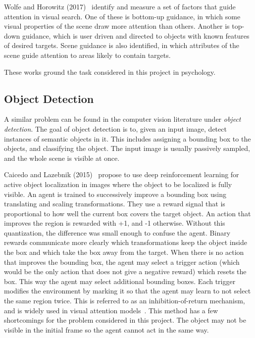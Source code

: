 Wolfe and Horowitz (2017)~\cite{wolfe_horowitz_2017} identify and measure a set of factors that guide attention in visual search.
One of these is bottom-up guidance, in which some visual properties of the scene draw more attention than others.
Another is top-down guidance, which is user driven and directed to objects with known features of desired targets.
Scene guidance is also identified, in which attributes of the scene guide attention to areas likely to contain targets. 

These works ground the task considered in this project in psychology.


\subsection{Object Detection}


A similar problem can be found in the computer vision literature under \textit{object detection}.
The goal of object detection is to, given an input image, detect instances of semantic objects in it.
This includes assigning a bounding box to the objects, and classifying the object.
The input image is usually passively sampled, and the whole scene is visible at once.

Caicedo and Lazebnik (2015)~\cite{caicedo_active_2015} propose to use deep reinforcement learning for active object localization in images where the object to be localized is fully visible.
An agent is trained to successively improve a bounding box using translating and scaling transformations.
They use a reward signal that is proportional to how well the current box covers the target object.
An action that improves the region is rewarded with +1, and -1 otherwise.
Without this quantization, the difference was small enough to confuse the agent.
Binary rewards communicate more clearly which transformations keep the object inside the box and which take the box away from the target.
When there is no action that improves the bounding box, the agent may select a trigger action (which would be the only action that does not give a negative reward) which resets the box.
This way the agent may select additional bounding boxes.
Each trigger modifies the environment by marking it so that the agent may learn to not select the same region twice.
This is referred to as an inhibition-of-return mechanism, and is widely used in visual attention models~\cite{[16] in caicedo_active_2015}.
This method has a few shortcomings for the problem considered in this project.
The object may not be visible in the initial frame so the agent cannot act in the same way. 

